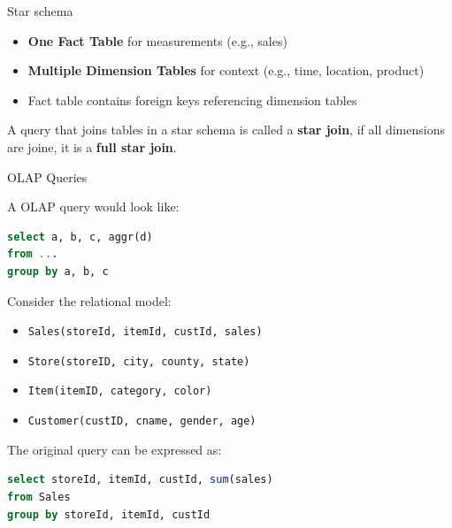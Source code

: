 \begin{definition}
    {Star schema}
    \begin{itemize}
        \item \textbf{One Fact Table} for measurements (e.g., sales)
        \item \textbf{Multiple Dimension Tables} for context (e.g., time, location, product)
        \item Fact table contains foreign keys referencing dimension tables
    \end{itemize}

    A query that joins tables in a star schema is called a \textbf{star join}, if all dimensions are joine, it is a \textbf{full star join}.
\end{definition}

\begin{theorem}
    {OLAP Queries}

    A OLAP query would look like:

    \begin{lstlisting}[language=SQL]
select a, b, c, aggr(d)
from ...
group by a, b, c
\end{lstlisting}

    Consider the relational model:
    \begin{itemize}
        \item \texttt{Sales(storeId, itemId, custId, sales)}
        \item \texttt{Store(storeID, city, county, state)}
        \item \texttt{Item(itemID, category, color)}
        \item \texttt{Customer(custID, cname, gender, age)}
    \end{itemize}

    The original query can be expressed as:


    \begin{lstlisting}[language=SQL]
select storeId, itemId, custId, sum(sales)
from Sales
group by storeId, itemId, custId
\end{lstlisting}


\end{theorem}
